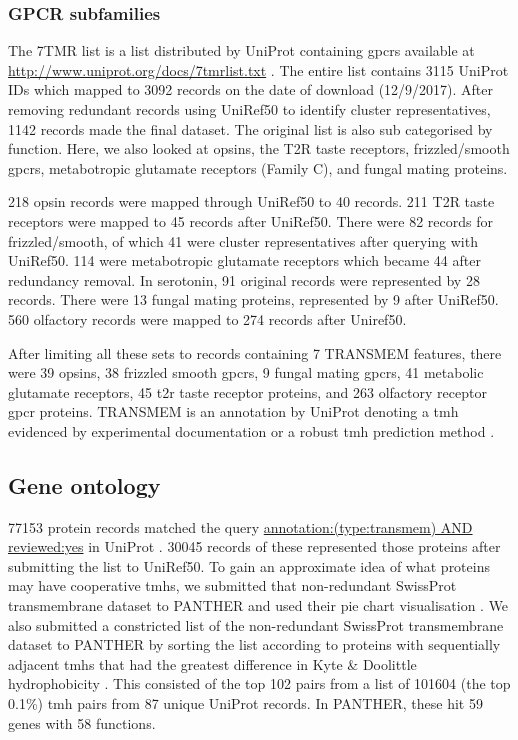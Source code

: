 \subsubsection{GPCR subfamilies}
The 7TMR list is a list distributed by UniProt containing \gls{gpcr}s available at \url{http://www.uniprot.org/docs/7tmrlist.txt} \cite{TheUniProtConsortium2014}.
The entire list contains 3115 UniProt IDs which mapped to 3092 records on the date of download (12/9/2017).
After removing redundant records using UniRef50 to identify cluster representatives, 1142 records made the final dataset.
The original list is also sub categorised by function.
Here, we also looked at opsins, the T2R taste receptors, frizzled/smooth \gls{gpcr}s, metabotropic glutamate receptors (Family C), and fungal mating proteins.

218 opsin records were mapped through UniRef50 to 40 records.
211 T2R taste receptors were mapped to 45 records after UniRef50.
There were 82 records for frizzled/smooth, of which 41 were cluster representatives after querying with UniRef50.
114 were metabotropic glutamate receptors which became 44 after redundancy removal.
In serotonin, 91 original records were represented by 28 records.
There were 13 fungal mating proteins, represented by 9 after UniRef50.
560 olfactory records were mapped to 274 records after Uniref50.

After limiting all these sets to records containing 7 TRANSMEM features, there were 39 opsins, 38 frizzled smooth \gls{gpcr}s, 9 fungal mating \gls{gpcr}s, 41 metabolic glutamate receptors, 45 t2r taste receptor proteins, and 263 olfactory receptor \gls{gpcr} proteins.
TRANSMEM is an annotation by UniProt denoting a \gls{tmh} evidenced by experimental documentation or a robust \gls{tmh} prediction method \cite{TheUniProtConsortium2014}.


\subsection{Gene ontology}
77153 protein records matched the query \url{annotation:(type:transmem) AND reviewed:yes} in UniProt \cite{TheUniProtConsortium2014}.
30045 records of these represented those proteins after submitting the list to UniRef50.
To gain an approximate idea of what proteins may have cooperative \gls{tmh}s, we submitted that non-redundant SwissProt transmembrane dataset to PANTHER and used their pie chart visualisation \cite{Mi2017}.
We also submitted a constricted list of the non-redundant SwissProt transmembrane dataset to PANTHER by sorting the list according to proteins with sequentially adjacent \gls{tmh}s that had the greatest difference in Kyte \& Doolittle hydrophobicity \cite{Kyte1982}.
This consisted of the top 102 pairs from a list of 101604 (the top 0.1\%) \gls{tmh} pairs from 87 unique UniProt records.
In PANTHER, these hit 59 genes with 58 functions.

